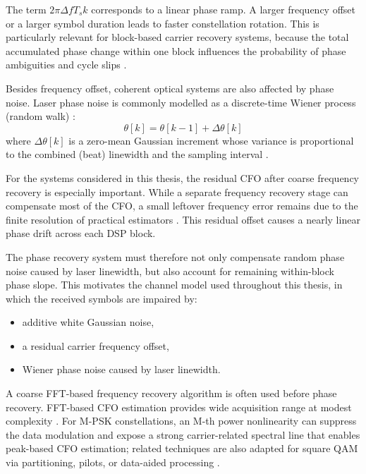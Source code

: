 The term $2\pi \Delta f T_s k$ corresponds to a linear phase ramp. A larger frequency offset
or a larger symbol duration leads to faster constellation rotation. This is particularly
relevant for block-based carrier recovery systems, because the total accumulated phase
change within one block influences the probability of phase ambiguities and cycle slips
\cite{Pfau2009JLT}.

Besides frequency offset, coherent optical systems are also affected by phase noise. Laser
phase noise is commonly modelled as a discrete-time Wiener process (random walk) \cite{RoudasCoherentSystems}:
\begin{equation}
\theta[k] = \theta[k-1] + \Delta \theta[k]
\end{equation}
where $\Delta\theta[k]$ is a zero-mean Gaussian increment whose variance is proportional to
the combined (beat) linewidth and the sampling interval \cite{RoudasCoherentSystems,Pfau2009JLT}.

For the systems considered in this thesis, the residual CFO after coarse frequency recovery
is especially important. While a separate frequency recovery stage can compensate most of
the CFO, a small leftover frequency error remains due to the finite resolution of practical
estimators \cite{Leven2007LPT,Selmi2009ECOC}. This residual offset causes a nearly linear
phase drift across each DSP block.

The phase recovery system must therefore not only compensate random phase noise caused by
laser linewidth, but also account for remaining within-block phase slope. This motivates
the channel model used throughout this thesis, in which the received symbols are impaired by:
\begin{itemize}
    \item additive white Gaussian noise,
    \item a residual carrier frequency offset,
    \item Wiener phase noise caused by laser linewidth.
\end{itemize}

A coarse FFT-based frequency recovery algorithm is often used before phase recovery.
FFT-based CFO estimation provides wide acquisition range at modest complexity
\cite{Leven2007LPT,Selmi2009ECOC}. For M-PSK constellations, an M-th power nonlinearity can
suppress the data modulation and expose a strong carrier-related spectral line that enables
peak-based CFO estimation; related techniques are also adapted for square QAM via
partitioning, pilots, or data-aided processing \cite{Rasmussen2011SPIE}.


